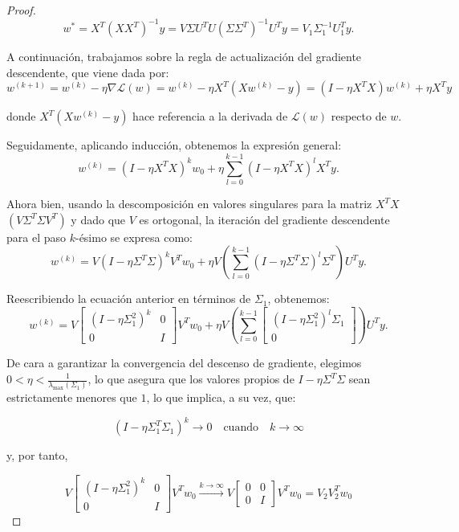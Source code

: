 \begin{proof}
    \[
        w^* = X^T {(X X^T)}^{-1} y = V \Sigma U^{T} U {(\Sigma \Sigma^{T})}^{-1} U^{T}y = V_1 \Sigma_1^{-1} U_{1}^T y.
    \]\newline

    A continuación, trabajamos sobre la regla de actualización del gradiente descendente, que viene dada por:
    \[
        w^{(k+1)} = w^{(k)} - \eta \nabla \mathcal{L}(w) = w^{(k)} - \eta X^T (Xw^{(k)} - y) = (I - \eta X^T X)w^{(k)} + \eta X^T y
    \]

    donde $X^T (Xw^{(k)} - y)$ hace referencia a la derivada de $\mathcal{L}(w)$ respecto de $w$.\newline

    Seguidamente, aplicando inducción, obtenemos la expresión general:
    \[
        w^{(k)} = (I - \eta X^T X)^k w_0 + \eta \sum_{l=0}^{k-1} (I - \eta X^T X)^l X^T y.
    \]\newline


    Ahora bien, usando la descomposición en valores singulares para la matriz $X^T X$ $(V \Sigma^T \Sigma V^T)$ y dado que $V$ es ortogonal, la iteración del gradiente descendente para el paso $k$-ésimo se expresa como:
    \[
        w^{(k)} = V (I - \eta \Sigma^T \Sigma)^k V^T w_0 + \eta V \left(\sum_{l=0}^{k-1} (I - \eta \Sigma^T \Sigma)^l \Sigma^T \right)U^T y.
    \]\newline

    Reescribiendo la ecuación anterior en términos de $\Sigma_1$, obtenemos:
    \[
        w^{(k)} = V \begin{bmatrix} (I - \eta \Sigma_1^2)^k & 0 \\ 0 & I \end{bmatrix} V^T w_0 + \eta V \left(\sum_{l=0}^{k-1} \begin{bmatrix} (I - \eta \Sigma_1^2)^l \Sigma_1 \\ 0 \end{bmatrix} \right) U^T y.
    \]

    De cara a garantizar la convergencia del descenso de gradiente, elegimos $0 < \eta < \frac{1}{\lambda_{\max}(\Sigma_1)}$, lo que asegura que los valores propios de $I - \eta \Sigma^T \Sigma$ sean estrictamente menores que $1$, lo que implica, a su vez, que:

    \[
        \left( I - \eta \Sigma_1^T \Sigma_1 \right)^k \to 0 \quad \text{cuando} \quad k \to \infty
    \]

    y, por tanto,

    \[
        V \begin{bmatrix} (I - \eta \Sigma_1^2)^k & 0 \\ 0 & I \end{bmatrix} V^T w_0 \xrightarrow{k \to \infty} V \begin{bmatrix} 0 & 0 \\ 0 & I \end{bmatrix} V^T w_0 = V_2 V_2^T w_0
    \]\newline


\end{proof}
